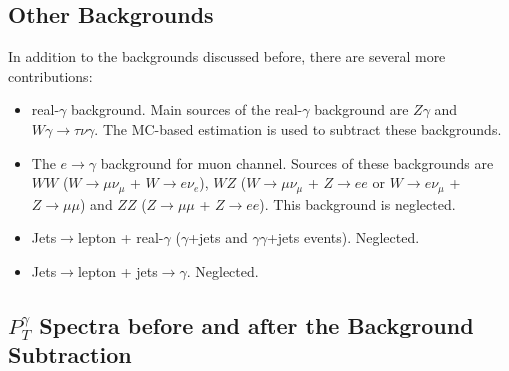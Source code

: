 

\subsection{Other Backgrounds}

In addition to the backgrounds discussed before, there are several more contributions:
\begin{itemize}
   \item real-$\gamma$ background. Main sources of the real-$\gamma$ background are $Z\gamma$ and $W\gamma \rightarrow \tau \nu \gamma$. The MC-based estimation is used to subtract these backgrounds.
   \item The $e \rightarrow \gamma$ background for muon channel. Sources of these backgrounds are $WW$ ($W \rightarrow \mu\nu_{\mu}$ + $W \rightarrow e\nu_e$), $WZ$ ($W \rightarrow \mu\nu_{\mu}$ + $Z \rightarrow ee$ or $W \rightarrow e\nu_{\mu}$ + $Z \rightarrow \mu\mu$) and $ZZ$ ($Z \rightarrow \mu\mu$ + $Z \rightarrow ee$). This background is neglected.
   \item Jets$ \rightarrow $lepton + real-$\gamma$ ($\gamma$+jets and $\gamma\gamma$+jets events). Neglected.
   \item Jets$ \rightarrow $lepton + jets$ \rightarrow \gamma$. Neglected. 
\end{itemize}

\subsection{$P_T^{\gamma}$ Spectra before and after the Background Subtraction}

